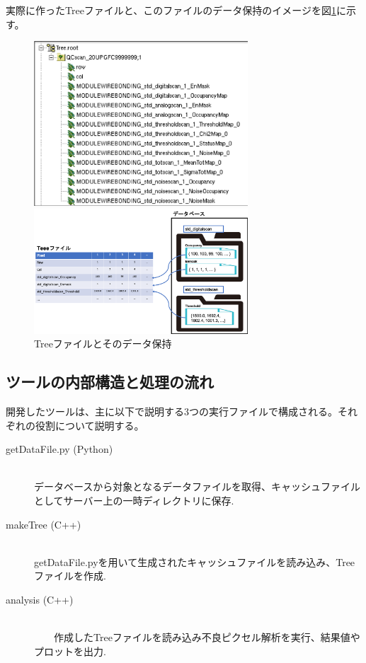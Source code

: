 実際に作ったTreeファイルと、このファイルのデータ保持のイメージを図\ref{analysis_tool_tree}に示す。

\begin{figure}[bpt]
  \begin{center}
  \begin{minipage}{0.4\hsize}
    \includegraphics[width=8cm]{analysis_tool_tree_file}
  \end{minipage}
  \begin{minipage}{0.5\hsize}
    \includegraphics[width=8cm]{analysis_tool_tree_image}
  \end{minipage}
  \caption[Treeファイルとそのデータ保持]{Treeファイルとそのデータ保持}
  \label{analysis_tool_tree}
  \end{center}
\end{figure}

\subsection{ツールの内部構造と処理の流れ}
開発したツールは、主に以下で説明する3つの実行ファイルで構成される。それぞれの役割について説明する。

\begin{description}
  \item[getDataFile.py (Python)]\mbox{}\\ 
    データベースから対象となるデータファイルを取得、キャッシュファイルとしてサーバー上の一時ディレクトリに保存.
  \item[makeTree (C++)]\mbox{}\\ 
    getDataFile.pyを用いて生成されたキャッシュファイルを読み込み、Treeファイルを作成.
  \item[analysis (C++)]\mbox{}\\ 
　　作成したTreeファイルを読み込み不良ピクセル解析を実行、結果値やプロットを出力.
\end{description}

